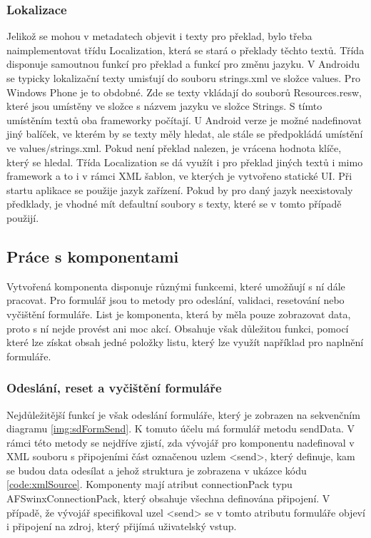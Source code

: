 \subsubsection{Lokalizace}
Jelikož se mohou v metadatech objevit i texty pro překlad, bylo třeba naimplementovat třídu Localization, která se stará o překlady těchto textů. Třída disponuje samoutnou funkcí pro překlad a funkcí pro změnu jazyku. V Androidu se typicky lokalizační texty umisťují do souboru strings.xml ve složce values. Pro Windows Phone je to obdobné. Zde se texty vkládají do souborů Resources.resw, které jsou umístěny ve složce s názvem jazyku ve složce Strings. S tímto umístěním textů oba frameworky počítají. U Android verze je možné nadefinovat jiný balíček, ve kterém by se texty měly hledat, ale stále se předpokládá umístění ve values/strings.xml. Pokud není překlad nalezen, je vrácena hodnota klíče, který se hledal. Třída Localization se dá využít i pro překlad jiných textů i mimo framework a to i v rámci XML šablon, ve kterých je vytvořeno statické UI. Při startu aplikace se použije jazyk zařízení. Pokud by pro daný jazyk neexistovaly předklady, je vhodné mít defaultní soubory s texty, které se v tomto případě použijí.

\subsection{Práce s komponentami}
Vytvořená komponenta disponuje různými funkcemi, které umožňují s ní dále pracovat. Pro formulář jsou to metody pro odeslání, validaci, resetování nebo vyčištění formuláře. List je komponenta, která by měla pouze zobrazovat data, proto s ní nejde provést ani moc akcí. Obsahuje však důležitou funkci, pomocí které lze získat obsah jedné položky listu, který lze využít například pro naplnění formuláře. 

\subsubsection{Odeslání, reset a vyčištění formuláře}
Nejdůležitější funkcí je však odeslání formuláře, který je zobrazen na sekvenčním diagramu \ref{img:sdFormSend}. K tomuto účelu má formulář metodu sendData. V rámci této metody se nejdříve zjistí, zda vývojář pro komponentu nadefinoval v XML souboru s připojeními část označenou uzlem <send>, který definuje, kam se budou data odesílat a jehož struktura je zobrazena v ukázce kódu \ref{code:xmlSource}. Komponenty mají atribut connectionPack typu AFSwinxConnectionPack, který obsahuje všechna definována připojení. V případě, že vývojář specifikoval uzel <send> se v tomto atributu formuláře objeví i připojení na zdroj, který přijímá uživatelský vstup. 

